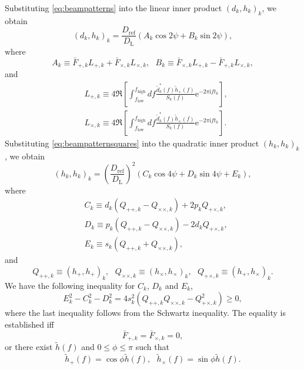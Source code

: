 \documentclass[12pt]{article}
\newcommand{\flow}{f_{\mathrm{low}}}
\newcommand{\fhigh}{f_{\mathrm{high}}}
\newcommand{\Dref}{D_{\mathrm{ref}}}
\newcommand{\DL}{D_{\mathrm{L}}}
\newcommand{\hp}{h_+}
\newcommand{\hc}{h_{\times}}
\newcommand{\thp}{\tilde{h}_+}
\newcommand{\thc}{\tilde{h}_{\times}}
\renewcommand{\th}{\tilde{h}}
\newcommand{\bFpk}{\bar{F}_{+, k}}
\newcommand{\bFck}{\bar{F}_{\times, k}}
\newcommand{\Lpk}{L_{+,k}}
\newcommand{\Lck}{L_{\times,k}}
\newcommand{\Qppk}{Q_{++,k}}
\newcommand{\Qpck}{Q_{+\times,k}}
\newcommand{\Qcck}{Q_{\times\times,k}}
\newcommand{\e}{\mathrm{e}}
\newcommand{\iu}{\mathrm{i}}
\begin{document}
Substituting \eqref{eq:beampatterns} into the linear inner product $(d_k, h_k)_k$, we obtain
\begin{equation}
(d_k, h_k)_k = \frac{\Dref}{\DL} \left( A_k \cos 2 \psi + B_k \sin 2 \psi \right),
\end{equation}
where 
\begin{equation}
A_k \equiv \bFpk \Lpk + \bFck \Lck,~~~B_k \equiv \bFck \Lpk - \bFpk \Lck,
\end{equation}
and
\begin{equation}
\begin{aligned}
&\Lpk \equiv 4 \Re \left[ \int^{\fhigh}_{\flow} df \frac{\tilde{d}^\ast_k (f) \thp(f)}{S_k(f)} \e^{-2 \pi \iu f t_k} \right],\\
&\Lck \equiv 4 \Re \left[ \int^{\fhigh}_{\flow} df \frac{\tilde{d}^\ast_k (f) \thc(f)}{S_k(f)} \e^{-2 \pi \iu f t_k} \right].
\end{aligned}
\end{equation}
Substituting \eqref{eq:beampatternsquares} into the quadratic inner product $(h_k, h_k)_k$, we obtain
\begin{equation}
(h_k, h_k)_k = \left(\frac{\Dref}{\DL}\right)^2 \left( C_k \cos 4 \psi + D_k \sin 4 \psi + E_k \right),
\end{equation}
where
\begin{equation}
\begin{aligned}
&C_k \equiv d_k ( \Qppk - \Qcck ) + 2 p_k \Qpck, \\
&D_k \equiv p_k ( \Qppk - \Qcck ) - 2 d_k \Qpck, \\
&E_k \equiv  s_k ( \Qppk + \Qcck ),
\end{aligned}
\end{equation}
and
\begin{equation}
\Qppk \equiv (\hp, \hp)_k,~~~\Qcck \equiv (\hc, \hc)_k,~~~\Qpck \equiv (\hp, \hc)_k.
\end{equation}
We have the following inequality for $C_k$, $D_k$ and $E_k$,
\begin{equation}
E^2_k - C^2_k - D^2_k = 4 s^2_k (\Qppk \Qcck - \Qpck^2) \geq 0, \label{eq:inequality_Ck_Dk_Ek}
\end{equation}
where the last inequality follows from the Schwartz inequality.
The equality is established iff
\begin{equation}
\bFpk = \bFck = 0, \label{eq:equality_cond_single_det_1}
\end{equation}
or there exist $\tilde{h}(f)$ and $0\leq\phi\leq\pi$ such that
\begin{equation}
\thp(f) = \cos \phi \th(f),~~~\thc(f) = \sin \phi \th(f). \label{eq:equality_cond_single_det_2}
\end{equation}
\end{document}
